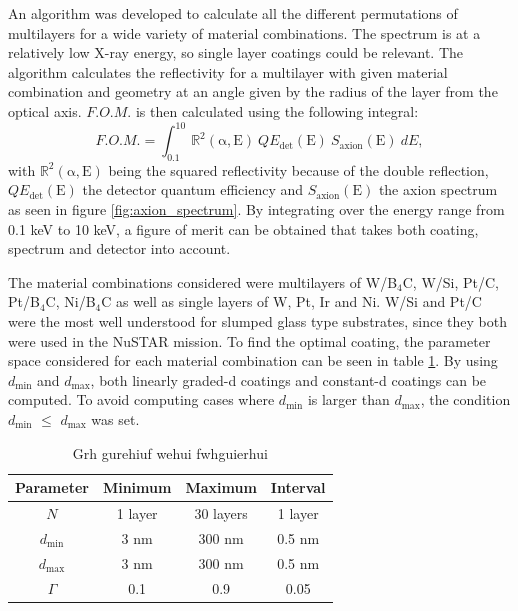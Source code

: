 An algorithm was developed to calculate all the different permutations of multilayers for a wide variety of material combinations. The spectrum is at a relatively low X-ray energy, so single layer coatings could be relevant. The algorithm calculates the reflectivity for a multilayer with given material combination and geometry at an angle given by the radius of the layer from the optical axis. $F.O.M.$ is then calculated using the following integral:
\begin{equation}\label{eq:fom}
	F.O.M. = \int_{0.1}^{10} \mathbb{R}^2(\mathrm{\alpha},\text{E})\ QE_{\text{det}}(\text{E})\ S_{\text{axion}}(\text{E})\ dE,
\end{equation}
with $\mathbb{R}^2(\mathrm{\alpha},\text{E})$ being the squared reflectivity because of the double reflection, $QE_{\text{det}}(\text{E})$ the detector quantum efficiency and $S_{\text{axion}}(\text{E})$ the axion spectrum as seen in figure \ref{fig:axion_spectrum}. By integrating over the energy range from 0.1 keV to 10 keV, a figure of merit can be obtained that takes both coating, spectrum and detector into account.

The material combinations considered were multilayers of W/B$_4$C, W/Si, Pt/C, Pt/B$_4$C, Ni/B$_4$C as well as single layers of W, Pt, Ir and Ni. W/Si and Pt/C were the most well understood for slumped glass type substrates, since they both were used in the NuSTAR mission. To find the optimal coating, the parameter space considered for each material combination can be seen in table \ref{tab:cast_parameter_space}. By using $d_{\text{min}}$ and $d_{\text{max}}$, both linearly graded-d coatings and constant-d coatings can be computed. To avoid computing cases where \(d_{\text{min}}\) is larger than \(d_{\text{max}}\), the condition \(d_{\text{min}}\) $\leq$ \(d_{\text{max}}\) was set.

\begin{table}[!h]
\begin{center}
\begin{tabular}{c|c|c|c}
Parameter & Minimum & Maximum & Interval \\
\hline
$N$ & 1 layer & 30 layers & 1 layer \\
$d_{\text{min}}$ & 3 nm & 300 nm & 0.5 nm \\
$d_{\text{max}}$ & 3 nm & 300 nm & 0.5 nm \\
$\Gamma$ & 0.1 & 0.9 & 0.05 \\
\end{tabular}
\end{center}
\caption{\footnotesize Grh gurehiuf wehui fwhguierhui}\label{tab:cast_parameter_space}
\end{table}

